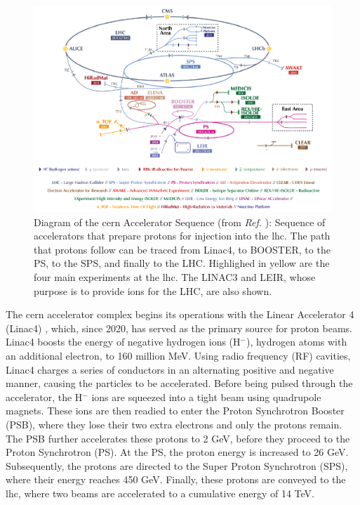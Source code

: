 \begin{figure}[h]
	\centering
	\includegraphics[width=\textwidth]{images/assets/cern_accelerator_complex.png}
	\caption[CERN Accelerator Sequence]{Diagram of the \acrshort{cern} Accelerator Sequence (from \textit{Ref.} \cite{cern-accelerator-complex}): Sequence of accelerators that prepare protons for injection into the \acrshort{lhc}. The path that protons follow can be traced from Linac4, to BOOSTER, to the PS, to the SPS, and finally to the LHC. Highlighed in yellow are the four main experiments at the \acrshort{lhc}. The LINAC3 and LEIR, whose purpose is to provide ions for the LHC, are also shown.}
	\label{fig:cern_acc_complex}
\end{figure}

The \acrshort{cern} accelerator complex begins its operations with the Linear Accelerator 4 (Linac4) \cite{Linac4}, which, since 2020, has served as the primary source for proton beams. Linac4 boosts the energy of negative hydrogen ions (H$^-$), hydrogen atoms with an additional electron, to 160 million MeV. Using radio frequency (RF) cavities, Linac4 charges a series of conductors in an alternating positive and negative manner, causing the particles to be accelerated. Before being pulsed through the accelerator, the H$^-$ ions are squeezed into a tight beam using quadrupole magnets. These ions are then readied to enter the Proton Synchrotron Booster (PSB), where they lose their two extra electrons and only the protons remain. The PSB further accelerates these protons to 2 GeV, before they proceed to the Proton Synchrotron (PS). At the PS, the proton energy is increased to 26 GeV. Subsequently, the protons are directed to the Super Proton Synchrotron (SPS), where their energy reaches 450 GeV. Finally, these protons are conveyed to the \acrshort{lhc}, where two beams are accelerated to a cumulative energy of 14 TeV.

